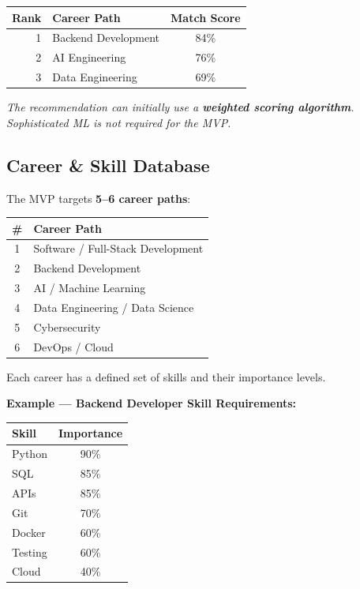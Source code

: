 \documentclass[12pt,a4paper]{article}
\begin{document}
\begin{center}
\begin{tabular}{@{} r l c @{}}
\toprule
\textbf{Rank} & \textbf{Career Path} & \textbf{Match Score} \\
\midrule
1 & Backend Development      & 84\% \\
2 & AI Engineering           & 76\% \\
3 & Data Engineering         & 69\% \\
\bottomrule
\end{tabular}
\end{center}

\noindent\textit{The recommendation can initially use a \textbf{weighted scoring algorithm}. Sophisticated ML is not required for the MVP.}

\subsection{Career \& Skill Database}
\label{sec:mvp-database}

The MVP targets \textbf{5--6 career paths}:

\begin{center}
\begin{tabular}{@{} c l @{}}
\toprule
\textbf{\#} & \textbf{Career Path} \\
\midrule
1 & Software / Full-Stack Development \\
2 & Backend Development \\
3 & AI / Machine Learning \\
4 & Data Engineering / Data Science \\
5 & Cybersecurity \\
6 & DevOps / Cloud \\
\bottomrule
\end{tabular}
\end{center}

\noindent Each career has a defined set of skills and their importance levels.

\bigskip
\noindent\textbf{Example --- Backend Developer Skill Requirements:}

\begin{center}
\begin{tabular}{@{} l c @{}}
\toprule
\textbf{Skill} & \textbf{Importance} \\
\midrule
Python   & 90\% \\
SQL      & 85\% \\
APIs     & 85\% \\
Git      & 70\% \\
Docker   & 60\% \\
Testing  & 60\% \\
Cloud    & 40\% \\
\bottomrule
\end{tabular}
\end{center}
\end{document}
